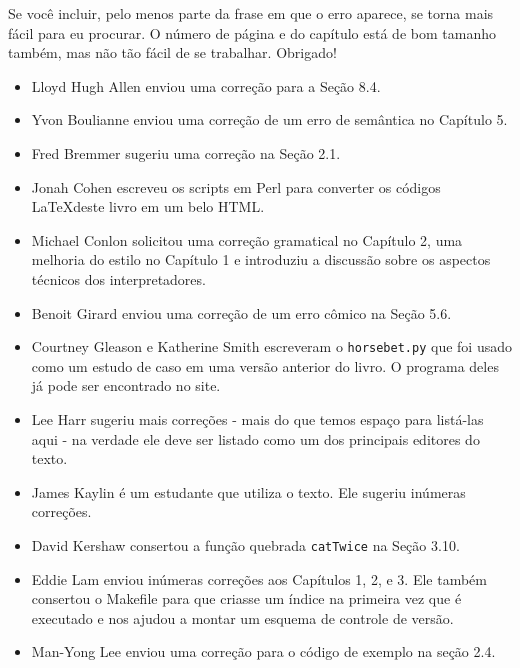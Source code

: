 \documentclass[10pt]{book}
\begin{document}
Se você incluir, pelo menos parte da frase em que o
erro aparece, se torna mais fácil para eu procurar. O número de página e
do capítulo está de bom tamanho também, mas não tão fácil de se trabalhar.
Obrigado!

\begin {itemize}

\small
\item Lloyd Hugh Allen enviou uma correção para a Seção 8.4.

\item Yvon Boulianne enviou uma correção de um erro de semântica no
Capítulo 5.

\item Fred Bremmer sugeriu uma correção na Seção 2.1.

\item Jonah Cohen escreveu os scripts em Perl para converter os
códigos \LaTeX deste livro em um belo HTML.

\item Michael Conlon solicitou uma correção gramatical no Capítulo 2,
uma melhoria do estilo no Capítulo 1 e introduziu a discussão
sobre os aspectos técnicos dos interpretadores.

\item Benoit Girard enviou uma
correção de um erro cômico na Seção 5.6.

\item Courtney Gleason e Katherine Smith escreveram o {\tt horsebet.py}
que foi usado como um estudo de caso em uma versão anterior do livro. O
programa deles já pode ser encontrado no site.

\item Lee Harr sugeriu mais correções - mais do que temos espaço para listá-las
aqui - na verdade ele deve ser listado como um dos principais editores
do texto.

\item James Kaylin é um estudante que utiliza o texto. Ele sugeriu
inúmeras correções.

\item David Kershaw consertou a função quebrada {\tt catTwice} na Seção
3.10.

\item Eddie Lam enviou inúmeras correções aos Capítulos 
1, 2, e 3.
Ele também consertou o Makefile para que criasse um índice na primeira vez que é
executado e nos ajudou a montar um esquema de controle de versão.  

\item Man-Yong Lee enviou uma correção para o código de exemplo na
seção 2.4.  


\end{itemize}
\end{document}
